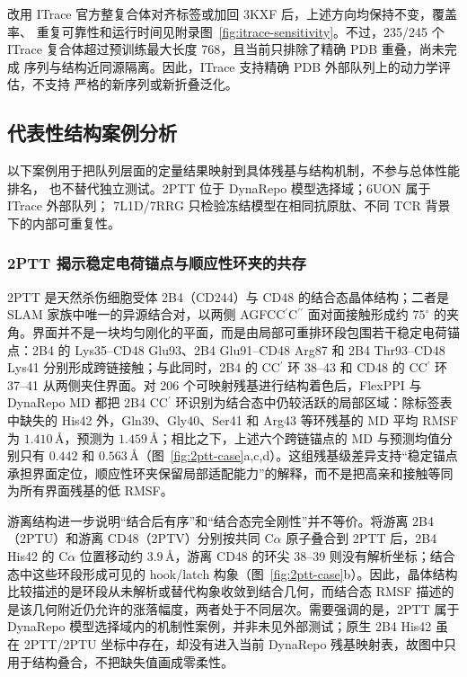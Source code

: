 改用 ITrace 官方整复合体对齐标签或加回 3KXF 后，上述方向均保持不变，覆盖率、
重复可靠性和运行时间见附录图~\ref{fig:itrace-sensitivity}。不过，235/245 个
ITrace 复合体超过预训练最大长度 768，且当前只排除了精确 PDB 重叠，尚未完成
序列与结构近同源隔离。因此，ITrace 支持精确 PDB 外部队列上的动力学评估，不支持
严格的新序列或新折叠泛化。

\subsection{代表性结构案例分析}

以下案例用于把队列层面的定量结果映射到具体残基与结构机制，不参与总体性能排名，
也不替代独立测试。2PTT 位于 DynaRepo 模型选择域；6UON 属于 ITrace 外部队列；
7L1D/7RRG 只检验冻结模型在相同抗原肽、不同 TCR 背景下的内部可重复性。

\subsubsection{2PTT 揭示稳定电荷锚点与顺应性环夹的共存}

2PTT 是天然杀伤细胞受体 2B4（CD244）与 CD48 的结合态晶体结构；二者是 SLAM 家族中唯一的异源结合对，以两侧 AGFCC$^\prime$C$^{\prime\prime}$ 面对面接触形成约 $75^\circ$ 的夹角\cite{velikovsky2007twob4cd48}。界面并不是一块均匀刚化的平面，而是由局部可重排环段包围若干稳定电荷锚点：2B4 的 Lys35--CD48 Glu93、2B4 Glu91--CD48 Arg87 和 2B4 Thr93--CD48 Lys41 分别形成跨链接触；与此同时，2B4 的 CC$^\prime$ 环 38--43 和 CD48 的 CC$^\prime$ 环 37--41 从两侧夹住界面。对 206 个可映射残基进行结构着色后，FlexPPI 与 DynaRepo MD 都把 2B4 CC$^\prime$ 环识别为结合态中仍较活跃的局部区域：除标签表中缺失的 His42 外，Gln39、Gly40、Ser41 和 Arg43 等环残基的 MD 平均 RMSF 为 $1.410\,\text{\AA}$，预测为 $1.459\,\text{\AA}$；相比之下，上述六个跨链锚点的 MD 与预测均值分别只有 $0.442$ 和 $0.563\,\text{\AA}$（图~\ref{fig:2ptt-case}a,c,d）。这组残基级差异支持“稳定锚点承担界面定位，顺应性环夹保留局部适配能力”的解释，而不是把高亲和接触等同为所有界面残基的低 RMSF。

游离结构进一步说明“结合后有序”和“结合态完全刚性”并不等价。将游离 2B4（2PTU）和游离 CD48（2PTV）分别按共同 C$\alpha$ 原子叠合到 2PTT 后，2B4 His42 的 C$\alpha$ 位置移动约 $3.9\,\text{\AA}$，游离 CD48 的环尖 38--39 则没有解析坐标；结合态中这些环段形成可见的 hook/latch 构象（图~\ref{fig:2ptt-case}b）。因此，晶体结构比较描述的是环段从未解析或替代构象收敛到结合几何，而结合态 RMSF 描述的是该几何附近仍允许的涨落幅度，两者处于不同层次。需要强调的是，2PTT 属于 DynaRepo 模型选择域内的机制性案例，并非未见外部测试；原生 2B4 His42 虽在 2PTT/2PTU 坐标中存在，却没有进入当前 DynaRepo 残基映射表，故图中只用于结构叠合，不把缺失值画成零柔性。

